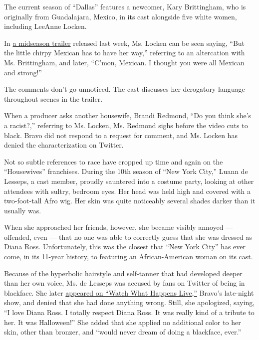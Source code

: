 The current season of ``Dallas'' features a newcomer, Kary Brittingham,
who is originally from Guadalajara, Mexico, in its cast alongside five
white women, including LeeAnne Locken.

In
\href{https://www.bravotv.com/the-real-housewives-of-dallas/season-4/videos/still-to-come-on-the-real-housewives-of-dallas-season}{a
midseason trailer} released last week, Ms. Locken can be seen saying,
``But the little chirpy Mexican has to have her way,'' referring to an
altercation with Ms. Brittingham, and later, ``C'mon, Mexican. I thought
you were all Mexican and strong!''

The comments don't go unnoticed. The cast discusses her derogatory
language throughout scenes in the trailer.

When a producer asks another housewife, Brandi Redmond, ``Do you think
she's a racist?,'' referring to Ms. Locken, Ms. Redmond sighs before the
video cuts to black. Bravo did not respond to a request for comment, and
Ms. Locken has denied the characterization on Twitter.

Not so subtle references to race have cropped up time and again on the
``Housewives'' franchises. During the 10th season of ``New York City,''
Luann de Lesseps, a cast member, proudly sauntered into a costume party,
looking at other attendees with sultry, bedroom eyes. Her head was held
high and covered with a two-foot-tall Afro wig. Her skin was quite
noticeably several shades darker than it usually was.

When she approached her friends, however, she became visibly annoyed ---
offended, even --- that no one was able to correctly guess that she was
dressed as Diana Ross. Unfortunately, this was the closest that ``New
York City'' has ever come, in its 11-year history, to featuring an
African-American woman on its cast.

Because of the hyperbolic hairstyle and self-tanner that had developed
deeper than her own voice, Ms. de Lesseps was accused by fans on Twitter
of being in blackface. She later
\href{https://www.bravotv.com/watch-what-happens-live-with-andy-cohen/season-15/episode-61/videos/luann-de-lesseps-controversial}{appeared
on ``Watch What Happens Live,''} Bravo's late-night show, and denied
that she had done anything wrong. Still, she apologized, saying, ``I
love Diana Ross. I totally respect Diana Ross. It was really kind of a
tribute to her. It was Halloween!'' She added that she applied no
additional color to her skin, other than bronzer, and ``would never
dream of doing a blackface, ever.''


